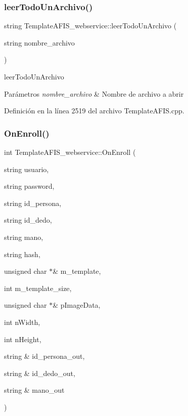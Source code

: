 \subsubsection{\texorpdfstring{leer\+Todo\+Un\+Archivo()}{leerTodoUnArchivo()}}
{\footnotesize\ttfamily string Template\+A\+F\+I\+S\+\_\+webservice\+::leer\+Todo\+Un\+Archivo (\begin{DoxyParamCaption}\item[{string}]{nombre\+\_\+archivo }\end{DoxyParamCaption})}



leer\+Todo\+Un\+Archivo 


\begin{DoxyParams}{Parámetros}
{\em nombre\+\_\+archivo} & Nombre de archivo a abrir \\
\hline
\end{DoxyParams}


Definición en la línea 2519 del archivo Template\+A\+F\+I\+S.\+cpp.

\hypertarget{classTemplateAFIS__webservice_a5fc2884ea75075e40a6056440021f27d}{}\label{classTemplateAFIS__webservice_a5fc2884ea75075e40a6056440021f27d} 
\subsubsection{\texorpdfstring{On\+Enroll()}{OnEnroll()}}
{\footnotesize\ttfamily int Template\+A\+F\+I\+S\+\_\+webservice\+::\+On\+Enroll (\begin{DoxyParamCaption}\item[{string}]{usuario,  }\item[{string}]{password,  }\item[{string}]{id\+\_\+persona,  }\item[{string}]{id\+\_\+dedo,  }\item[{string}]{mano,  }\item[{string}]{hash,  }\item[{unsigned char $\ast$\&}]{m\+\_\+template,  }\item[{int}]{m\+\_\+template\+\_\+size,  }\item[{unsigned char $\ast$\&}]{p\+Image\+Data,  }\item[{int}]{n\+Width,  }\item[{int}]{n\+Height,  }\item[{string \&}]{id\+\_\+persona\+\_\+out,  }\item[{string \&}]{id\+\_\+dedo\+\_\+out,  }\item[{string \&}]{mano\+\_\+out }\end{DoxyParamCaption})}



